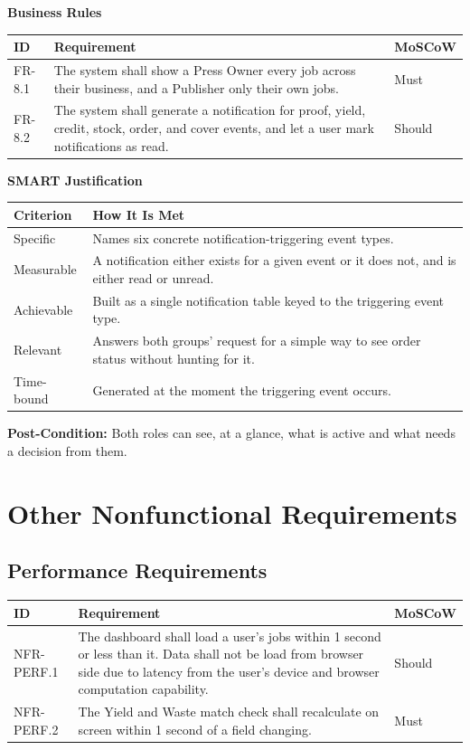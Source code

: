 \documentclass{scrreprt}
\begin{document}
\textbf{Business Rules}
\begin{longtable}{p{} L{0.76\textwidth} p{0.12\textwidth}}
\toprule
{} \textbf{ID} & \textbf{Requirement} & \textbf{MoSCoW} \\
\midrule
\endhead
FR-8.1 & The system shall show a Press Owner every job across their business, and a Publisher only their own jobs. & Must \\
FR-8.2 & The system shall generate a notification for proof, yield, credit, stock, order, and cover events, and let a user mark notifications as read. & Should \\
\bottomrule
\end{longtable}

\textbf{SMART Justification}
\begin{longtable}{p{} L{0.82\textwidth}}
\toprule
{} \textbf{Criterion} & \textbf{How It Is Met} \\
\midrule
\endhead
Specific & Names six concrete notification-triggering event types. \\
Measurable & A notification either exists for a given event or it does not, and is either read or unread. \\
Achievable & Built as a single notification table keyed to the triggering event type. \\
Relevant & Answers both groups' request for a simple way to see order status without hunting for it. \\
Time-bound & Generated at the moment the triggering event occurs. \\
\bottomrule
\end{longtable}

\textbf{Post-Condition:} Both roles can see, at a glance, what is active and what needs a decision from them.

\chapter{Other Nonfunctional Requirements}

\section{Performance Requirements}
\begin{longtable}{L{0.18\textwidth} L{0.68\textwidth} p{0.14\textwidth}}
\toprule
{} \textbf{ID} & \textbf{Requirement} & \textbf{MoSCoW} \\
\midrule
\endhead
NFR-PERF.1 & The dashboard shall load a user's jobs within 1 second or less than it. Data shall not be load from browser side due to latency from the user's device and browser computation capability. & Should \\
NFR-PERF.2 & The Yield and Waste match check shall recalculate on screen within 1 second of a field changing. & Must \\
\bottomrule
\end{longtable}
\end{document}
